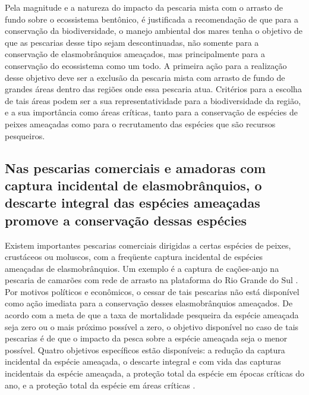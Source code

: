 \documentclass[a4paper,11pt,twoside,showtrims,onecolumn,openright,final]{memoir}
\begin{document}
Pela magnitude e a natureza do impacto da pescaria mista com o arrasto de fundo sobre 
o ecossistema bentônico, é justificada a recomendação de que  para a conservação da biodiversidade, 
o manejo ambiental dos mares tenha o objetivo de que as pescarias desse tipo sejam descontinuadas, 
não somente para a conservação de elasmobrânquios ameaçados, mas principalmente para a conservação 
do ecossistema como um todo.  A primeira ação para a realização desse objetivo deve ser a exclusão 
da pescaria mista com arrasto de fundo de grandes áreas dentro das regiões onde essa pescaria atua. 
Critérios para a escolha de tais áreas podem ser a sua representatividade para a biodiversidade da região, 
e a sua importância como áreas críticas, tanto para a conservação de espécies de peixes ameaçadas como para 
o recrutamento das espécies que são recursos pesqueiros.

\subsection*{Nas pescarias comerciais e amadoras com captura incidental de elasmobrânquios, 
o descarte integral  das espécies ameaçadas promove a conservação dessas espécies}

Existem importantes pescarias comerciais dirigidas a certas espécies de peixes, crustáceos 
ou moluscos, com a freqüente captura incidental de espécies ameaçadas de elasmobrânquios. 
Um exemplo é a captura de cações-anjo na pescaria de camarões com rede de arrasto na plataforma 
do Rio Grande do Sul \citep{haimovici1996d}. %
Por motivos políticos e econômicos, o cessar de tais pescarias não está disponível como 
ação imediata para a conservação desses elasmobrânquios ameaçados. De acordo com a meta de que a 
taxa de mortalidade pesqueira da espécie ameaçada seja zero ou o mais próximo possível a zero,  
o objetivo disponível no caso de tais pescarias é  de que o impacto da pesca sobre a espécie ameaçada 
seja o menor possível.  Quatro objetivos específicos estão disponíveis: a redução da captura incidental 
da espécie ameaçada, o descarte integral e com vida das capturas incidentais da espécie ameaçada, 
a proteção total da espécie em épocas críticas do ano, e a proteção total da espécie 
em áreas críticas \citep{camhi1998,walker2004}. %
\end{document}
